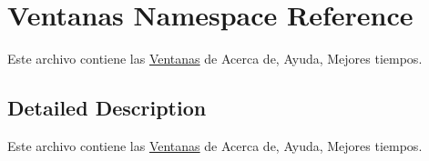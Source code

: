 \hypertarget{namespace_ventanas}{\section{Ventanas Namespace Reference}
\label{namespace_ventanas}
}


Este archivo contiene las \hyperlink{namespace_ventanas}{Ventanas} de Acerca de, Ayuda, Mejores tiempos.  




\subsection{Detailed Description}
Este archivo contiene las \hyperlink{namespace_ventanas}{Ventanas} de Acerca de, Ayuda, Mejores tiempos. 